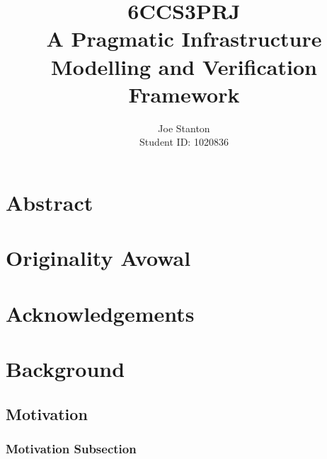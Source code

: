 \documentclass{cshonours}
\title{6CCS3PRJ \\\vspace{0.5cm}
  A Pragmatic Infrastructure Modelling and Verification Framework}
\author{Joe Stanton\\\vspace{0.5cm}
  Student ID: 1020836
}
\begin{document}
\maketitle

\chapter*{Abstract}
\chapter*{Originality Avowal}
\chapter*{Acknowledgements}

\tableofcontents

\chapter{Background}
\section{Motivation}
\subsection{Motivation Subsection}
% 
% 
% 
% 
% 
% 
% 

\printbibliography[title=References]
% 
\end{document}
